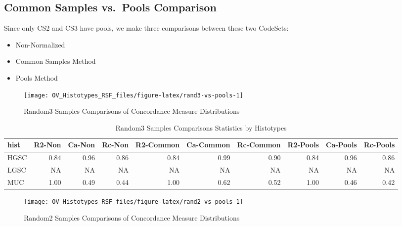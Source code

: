 \documentclass[
]{report}
\providecommand{\tightlist}{%
  \setlength{\itemsep}{0pt}\setlength{\parskip}{0pt}}
\begin{document}
\hypertarget{common-samples-vs.-pools-comparison}{%
\subsection{Common Samples vs.~Pools Comparison}\label{common-samples-vs.-pools-comparison}}

Since only CS2 and CS3 have pools, we make three comparisons between these two CodeSets:

\begin{itemize}
\tightlist
\item
  Non-Normalized
\item
  Common Samples Method
\item
  Pools Method
\end{itemize}

\begin{figure}[H]

{\centering \texttt{[image: OV\_Histotypes\_RSF\_files/figure-latex/rand3-vs-pools-1]} 

}

\caption{Random3 Samples Comparisons of Concordance Measure Distributions}\label{fig:rand3-vs-pools}
\end{figure}

\begin{table}

\caption{\label{tab:rand3-vs-pools-stats}Random3 Samples Comparisons Statistics by Histotypes}
\centering
\begin{tabular}[t]{l|r|r|r|r|r|r|r|r|r}
\hline
hist & R2-Non & Ca-Non & Rc-Non & R2-Common & Ca-Common & Rc-Common & R2-Pools & Ca-Pools & Rc-Pools\\
\hline
HGSC & 0.84 & 0.96 & 0.86 & 0.84 & 0.99 & 0.90 & 0.84 & 0.96 & 0.86\\
\hline
LGSC & NA & NA & NA & NA & NA & NA & NA & NA & NA\\
\hline
MUC & 1.00 & 0.49 & 0.44 & 1.00 & 0.62 & 0.52 & 1.00 & 0.46 & 0.42\\
\hline
\end{tabular}
\end{table}

\begin{figure}[H]

{\centering \texttt{[image: OV\_Histotypes\_RSF\_files/figure-latex/rand2-vs-pools-1]} 

}

\caption{Random2 Samples Comparisons of Concordance Measure Distributions}\label{fig:rand2-vs-pools}
\end{figure}
\end{document}
